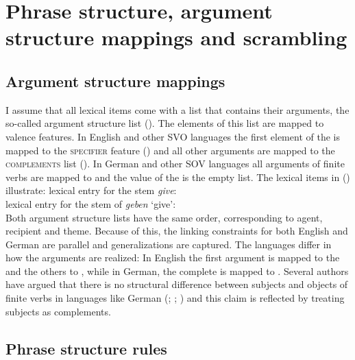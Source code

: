 \section{Phrase structure, argument structure mappings and scrambling}

\subsection{Argument structure mappings}

I assume that all lexical items come with a list that contains their arguments, the so-called
argument structure list (\argst). The elements of this list are mapped to valence features. In
English and other SVO languages the first element of the \argstl is mapped to the \textsc{specifier}
feature (\spr) and all other arguments are mapped to the \textsc{complements} list (\comps). In
German and other SOV languages all arguments of finite verbs are mapped to \comps and the value of
the \sprf is the empty list. The lexical items in () illustrate:
\eal
\label{lex-giv-geben}
\ex lexical entry for the stem \emph{give}:\\
\ex lexical entry for the stem of \emph{geben} `give':\\
\zl
Both argument structure lists have the same order, corresponding to agent, recipient and
theme. Because of this, the linking constraints for both English and German are parallel and
generalizations are captured. The languages differ in how the arguments are realized: In English the
first argument is mapped to the \sprl {} and the others to \comps {}, while in German,
the complete \argstl {} is mapped to \comps. Several authors have argued that there is no
structural difference between subjects and objects of finite verbs in languages like German
(\citealp[Section~6.3]{Haider93a}; \citealp[]{Eisenberg94b}; ) and this claim is reflected by treating subjects as complements. 


\subsection{Phrase structure rules}

